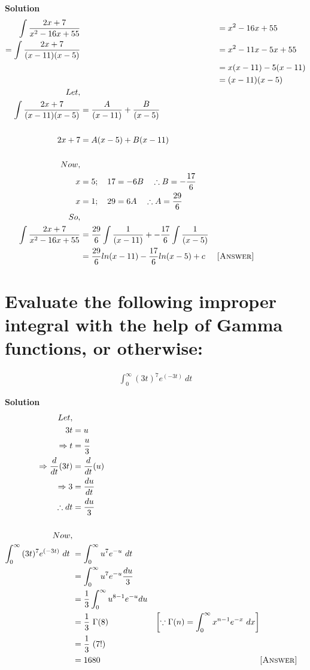 \documentclass[12pt]{article}
\begin{document}
\textbf{Solution}
\begin{align*}
    \int {\frac{2x+7}{x^2-16x+55}} & & &= x^2-16x+55\\
    =\int {\frac{2x+7}{(x-11)(x-5)}} & & &=x^2-11x-5x+55\\
                             & &  &=x(x-11)-5(x-11)\\
                             & &  &=(x-11)(x-5)\\
    Let,\\
    \int {\frac{2x+7}{(x-11)(x-5)}}&=\frac{A}{(x-11)}+\frac{B}{(x-5)}\\\\
    2x+7 &=A(x-5)+B(x-11)\\\\
    Now,\\
    x&=5;\ \ \ 17=-6B\ \ \ \therefore B=-\frac{17}{6}\\
    x&=1;\ \ \ 29=6A\ \ \ \therefore A=\frac{29}{6}\\
    So,\\
     \int {\frac{2x+7}{x^2-16x+55}} &=\frac{29}{6}\int {\frac{1}{(x-11)}} + -\frac{17}{6} \int{\frac{1}{(x-5)}}\\
    &=\frac{29}{6}ln(x-11)-\frac{17}{6}ln(x-5)+c
    & & \textsc{[Answer]}
\end{align*}
\pagebreak


\section{Evaluate the following improper integral with the help of Gamma functions, or otherwise:}


\begin{align*}
    \int_{0}^{\infty}{(3t)^7}{e^{(-3t)}}\ dt
\end{align*}


\textbf{Solution}
\begin{align*}
    Let,\\ 3t&=u\\
    \Rightarrow t&=\frac{u}{3}\\
    \Rightarrow \frac{d}{dt}(3t)&=\frac{d}{dt}(u)\\
    \Rightarrow 3&=\frac{du}{dt}\\
    \therefore dt&=\frac{du}{3}\\\\
    Now,\\ \int_{0}^{\infty}{(3t)^7}{e^{(-3t)}}\ dt\
    &=\int_{0}^{\infty}{u^7}{e^{-u}}\ dt\\
    &=\int_{0}^{\infty}{u^7}{e^{-u}}\frac{du}{3}\\
    &=\frac{1}{3}\int_{0}^{\infty}{u^{8-1}}{e^{-u}}du\\
    &=\frac{1}{3}\ \Gamma(8) & \left[\because \Gamma(n)=\int_{0}^{\infty}{x^{n-1}}e^{-x}\ dx\right]\\
    &=\frac{1}{3}\ (7!)\\
    &=1680
    & & \textsc{[Answer]}
\end{align*}
\end{document}
